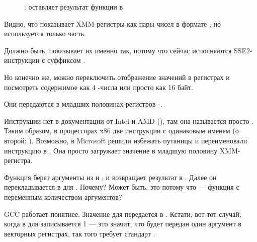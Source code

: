 \clearpage
\begin{figure}[H]
\centering
{}
\caption{\olly: \FLD оставляет результат функции в }
\label{fig:FPU_SIMD_simple_olly5}
\end{figure}

Видно, что \olly показывает XMM-регистры как пары чисел в формате \Tdouble,
но используется только  часть.

Должно быть, \olly показывает их именно так, потому что сейчас исполняются SSE2-инструкции
с суффиксом .

Но конечно же, можно переключить отображение значений в регистрах и посмотреть содержимое
как 4 \Tfloat{}-числа или просто как 16 байт.

\clearpage
{}



Они передаются в младших половинах регистров -.



Инструкции  нет в документации от Intel и AMD  (), там она называется просто .
Таким образом, в процессорах x86 две инструкции с одинаковым именем (о второй: ).
Возможно, в Microsoft решили избежать путаницы и переименовали инструкцию в .
Она просто загружает значение в младшую половину XMM-регистра.

Функция  берет аргументы из  и , 
и возвращает результат в .
Далее он перекладывается в \RDX для \printf. 
Почему? 
Может быть, это потому что 
\printf --- функция с переменным количеством аргументов?



GCC работает понятнее. 
Значение для \printf передается в . 
Кстати, вот тот случай, когда в \EAX
для \printf записывается 1 --- это значит, что будет передан один аргумент в векторных регистрах, 
так того требует стандарт \SysVABI.




